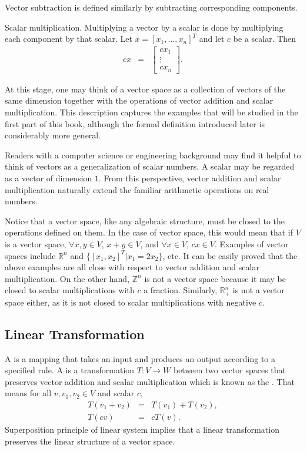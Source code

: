 Vector subtraction is defined similarly by subtracting corresponding components.

Scalar multiplication. Multiplying a vector by a scalar is done by multiplying each component by that scalar. Let $x = [x_1,\ldots,x_n]^T$ and let $c$ be a scalar. Then
\begin{eqnarray}
	cx
	&=&
	\left[
	\begin{array}{c}
		cx_1 \\
		\vdots \\
		cx_n
	\end{array}
	\right].
	\nonumber
\end{eqnarray}

At this stage, one may think of a vector space as a collection of vectors of the same dimension together with the operations of vector addition and scalar multiplication. This description captures the examples that will be studied in the first part of this book, although the formal definition introduced later is considerably more general.

Readers with a computer science or engineering background may find it helpful to think of vectors as a generalization of scalar numbers. A scalar may be regarded as a vector of dimension $1$. From this perspective, vector addition and scalar multiplication naturally extend the familiar arithmetic operations on real numbers.

Notice that a vector space, like any algebraic structure, must be closed to the operations defined on them. In the case of vector space, this would mean that if $V$ is a vector space, $\forall x, y \in V$, $x + y \in V$, and $\forall x \in V$, $cx \in V$. Examples of vector spaces include $\mathbb{R}^n$ and $\{[x_1,x_2]^T|x_1 = 2x_2\}$, etc. It can be easily proved that the above examples are all close with respect to vector addition and scalar multiplication. On the other hand, $\mathbb{Z}^n$ is not a vector space because it may be closed to scalar multiplications with $c$ a fraction. Similarly, $\mathbb{R}^n_{+}$ is not a vector space either, as it is not closed to scalar multiplications with negative $c$.

\subsection{Linear Transformation}

A  is a mapping that takes an input and produces an output according to a specified rule. A  is a transformation $T: V\to W$ between two vector spaces that preserves vector addition and scalar multiplication which is known as the . That means for all  $v,v_1,v_2\in V$ and scalar $c$,
\begin{eqnarray}
	T(v_1+v_2)
	&=&
	T(v_1)+T(v_2),
	\nonumber \\
	T(cv)
	&=&
	cT(v).
	\nonumber
\end{eqnarray}
Superposition principle of linear system implies that a linear transformation preserves the linear structure of a vector space.

